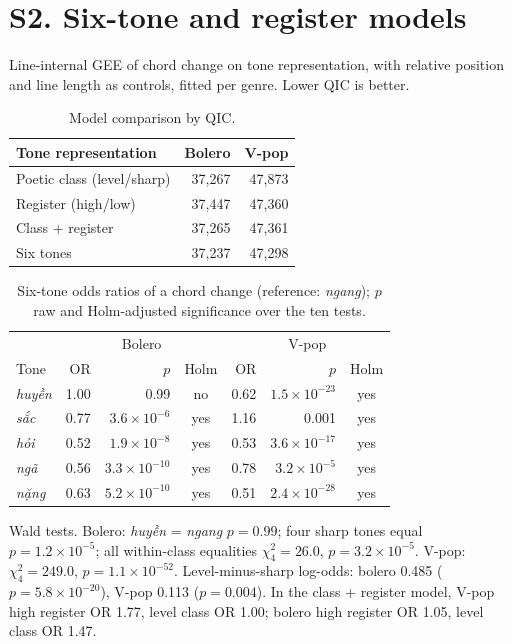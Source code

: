 \documentclass[11pt]{article}
\begin{document}
\section*{S2. Six-tone and register models}
Line-internal GEE of chord change on tone representation, with relative position and line length as controls, fitted per genre. Lower QIC is better.
\begin{table}[H]\centering\caption{Model comparison by QIC.}
\begin{tabular}{lrr}\toprule Tone representation & Bolero & V-pop\\\midrule
Poetic class (level/sharp) & 37{,}267 & 47{,}873\\
Register (high/low) & 37{,}447 & 47{,}360\\
Class + register & 37{,}265 & 47{,}361\\
Six tones & 37{,}237 & 47{,}298\\
\bottomrule\end{tabular}\end{table}
\begin{table}[H]\centering\caption{Six-tone odds ratios of a chord change (reference: \emph{ngang}); $p$ raw and Holm-adjusted significance over the ten tests.}
\begin{tabular}{lrrcrrc}\toprule & \multicolumn{3}{c}{Bolero} & \multicolumn{3}{c}{V-pop}\\ Tone & OR & $p$ & Holm & OR & $p$ & Holm\\\midrule
\emph{huyền} & 1.00 & 0.99 & no & 0.62 & $1.5\times10^{-23}$ & yes\\
\emph{sắc} & 0.77 & $3.6\times10^{-6}$ & yes & 1.16 & 0.001 & yes\\
\emph{hỏi} & 0.52 & $1.9\times10^{-8}$ & yes & 0.53 & $3.6\times10^{-17}$ & yes\\
\emph{ngã} & 0.56 & $3.3\times10^{-10}$ & yes & 0.78 & $3.2\times10^{-5}$ & yes\\
\emph{nặng} & 0.63 & $5.2\times10^{-10}$ & yes & 0.51 & $2.4\times10^{-28}$ & yes\\
\bottomrule\end{tabular}\end{table}
Wald tests. Bolero: \emph{huyền} = \emph{ngang} $p=0.99$; four sharp tones equal $p=1.2\times10^{-5}$; all within-class equalities $\chi^2_4=26.0$, $p=3.2\times10^{-5}$. V-pop: $\chi^2_4=249.0$, $p=1.1\times10^{-52}$. Level-minus-sharp log-odds: bolero 0.485 ($p=5.8\times10^{-20}$), V-pop 0.113 ($p=0.004$). In the class + register model, V-pop high register OR 1.77, level class OR 1.00; bolero high register OR 1.05, level class OR 1.47.
\end{document}
